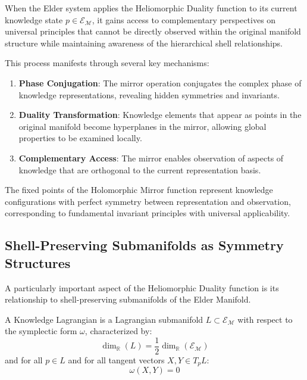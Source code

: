 \begin{theorem}
When the Elder system applies the Heliomorphic Duality function to its current knowledge state $p \in \mathcal{E}_{\mathcal{M}}$, it gains access to complementary perspectives on universal principles that cannot be directly observed within the original manifold structure while maintaining awareness of the hierarchical shell relationships.
\end{theorem}

This process manifests through several key mechanisms:

\begin{enumerate}
\item \textbf{Phase Conjugation}: The mirror operation conjugates the complex phase of knowledge representations, revealing hidden symmetries and invariants.
\item \textbf{Duality Transformation}: Knowledge elements that appear as points in the original manifold become hyperplanes in the mirror, allowing global properties to be examined locally.
\item \textbf{Complementary Access}: The mirror enables observation of aspects of knowledge that are orthogonal to the current representation basis.
\end{enumerate}

\begin{proposition}
The fixed points of the Holomorphic Mirror function represent knowledge configurations with perfect symmetry between representation and observation, corresponding to fundamental invariant principles with universal applicability.
\end{proposition}

\subsection{Shell-Preserving Submanifolds as Symmetry Structures}

A particularly important aspect of the Heliomorphic Duality function is its relationship to shell-preserving submanifolds of the Elder Manifold.

\begin{definition}
A Knowledge Lagrangian is a Lagrangian submanifold $L \subset \mathcal{E}_{\mathcal{M}}$ with respect to the symplectic form $\omega$, characterized by:
\begin{equation}
\dim_{\mathbb{R}}(L) = \frac{1}{2}\dim_{\mathbb{R}}(\mathcal{E}_{\mathcal{M}})
\end{equation}
and for all $p \in L$ and for all tangent vectors $X, Y \in T_pL$:
\begin{equation}
\omega(X, Y) = 0
\end{equation}
\end{definition}

